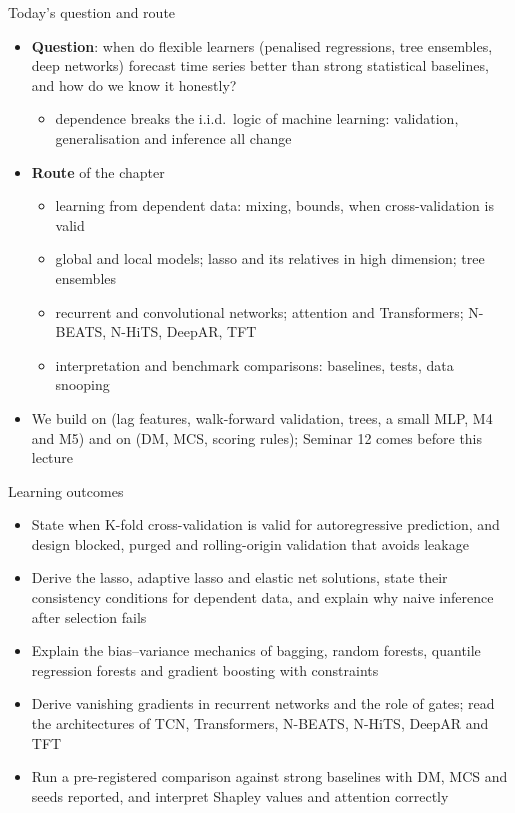 \begin{frame}{Today's question and route}
\itemsize{\small}
\begin{itemize}
    \item \textbf{Question}: when do flexible learners (penalised regressions, tree ensembles, deep networks) forecast time series better than strong statistical baselines, and how do we know it honestly?
    \begin{itemize}
        \item dependence breaks the i.i.d.\ logic of machine learning: validation, generalisation and inference all change
    \end{itemize}
    \item \textbf{Route} of the chapter
    \begin{itemize}
        \item learning from dependent data: mixing, bounds, when cross-validation is valid
        \item global and local models; lasso and its relatives in high dimension; tree ensembles
        \item recurrent and convolutional networks; attention and Transformers; N-BEATS, N-HiTS, DeepAR, TFT
        \item interpretation and benchmark comparisons: baselines, tests, data snooping
    \end{itemize}
    \item We build on  (lag features, walk-forward validation, trees, a small MLP, M4 and M5) and on  (DM, MCS, scoring rules); Seminar 12 comes before this lecture
\end{itemize}
\end{frame}

\begin{frame}{Learning outcomes}
\itemsize{\small}
\begin{itemize}
    \item State when K-fold cross-validation is valid for autoregressive prediction, and design blocked, purged and rolling-origin validation that avoids leakage
    \item Derive the lasso, adaptive lasso and elastic net solutions, state their consistency conditions for dependent data, and explain why naive inference after selection fails
    \item Explain the bias--variance mechanics of bagging, random forests, quantile regression forests and gradient boosting with constraints
    \item Derive vanishing gradients in recurrent networks and the role of gates; read the architectures of TCN, Transformers, N-BEATS, N-HiTS, DeepAR and TFT
    \item Run a pre-registered comparison against strong baselines with DM, MCS and seeds reported, and interpret Shapley values and attention correctly
\end{itemize}
\end{frame}

